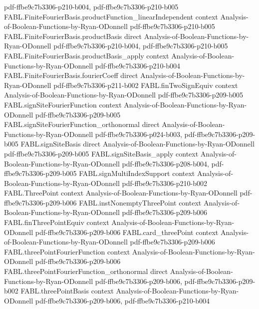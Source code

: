 \begin{theorem}
  {pdf-ffbe9c7b3306-p210-b004,
    pdf-ffbe9c7b3306-p210-b005}
\proofstep
  {FABL.FiniteFourierBasis.productFunction_linearIndependent}
  {context}
  {Analysis-of-Boolean-Functions-by-Ryan-ODonnell}
  {pdf-ffbe9c7b3306-p210-b005}
\proofstep
  {FABL.FiniteFourierBasis.productBasis}
  {direct}
  {Analysis-of-Boolean-Functions-by-Ryan-ODonnell}
  {pdf-ffbe9c7b3306-p210-b004,
    pdf-ffbe9c7b3306-p210-b005}
\proofstep
  {FABL.FiniteFourierBasis.productBasis_apply}
  {context}
  {Analysis-of-Boolean-Functions-by-Ryan-ODonnell}
  {pdf-ffbe9c7b3306-p210-b004}
\proofstep
  {FABL.FiniteFourierBasis.fourierCoeff}
  {direct}
  {Analysis-of-Boolean-Functions-by-Ryan-ODonnell}
  {pdf-ffbe9c7b3306-p211-b002}
\proofstep
  {FABL.finTwoSignEquiv}
  {context}
  {Analysis-of-Boolean-Functions-by-Ryan-ODonnell}
  {pdf-ffbe9c7b3306-p209-b005}
\proofstep
  {FABL.signSiteFourierFunction}
  {context}
  {Analysis-of-Boolean-Functions-by-Ryan-ODonnell}
  {pdf-ffbe9c7b3306-p209-b005}
\proofstep
  {FABL.signSiteFourierFunction_orthonormal}
  {direct}
  {Analysis-of-Boolean-Functions-by-Ryan-ODonnell}
  {pdf-ffbe9c7b3306-p024-b003,
    pdf-ffbe9c7b3306-p209-b005}
\proofstep
  {FABL.signSiteBasis}
  {direct}
  {Analysis-of-Boolean-Functions-by-Ryan-ODonnell}
  {pdf-ffbe9c7b3306-p209-b005}
\proofstep
  {FABL.signSiteBasis_apply}
  {context}
  {Analysis-of-Boolean-Functions-by-Ryan-ODonnell}
  {pdf-ffbe9c7b3306-p208-b004,
    pdf-ffbe9c7b3306-p209-b005}
\proofstep
  {FABL.signMultiIndexSupport}
  {context}
  {Analysis-of-Boolean-Functions-by-Ryan-ODonnell}
  {pdf-ffbe9c7b3306-p210-b002}
\proofstep
  {FABL.ThreePoint}
  {context}
  {Analysis-of-Boolean-Functions-by-Ryan-ODonnell}
  {pdf-ffbe9c7b3306-p209-b006}
\proofstep
  {FABL.instNonemptyThreePoint}
  {context}
  {Analysis-of-Boolean-Functions-by-Ryan-ODonnell}
  {pdf-ffbe9c7b3306-p209-b006}
\proofstep
  {FABL.finThreePointEquiv}
  {context}
  {Analysis-of-Boolean-Functions-by-Ryan-ODonnell}
  {pdf-ffbe9c7b3306-p209-b006}
\proofstep
  {FABL.card_threePoint}
  {context}
  {Analysis-of-Boolean-Functions-by-Ryan-ODonnell}
  {pdf-ffbe9c7b3306-p209-b006}
\proofstep
  {FABL.threePointFourierFunction}
  {context}
  {Analysis-of-Boolean-Functions-by-Ryan-ODonnell}
  {pdf-ffbe9c7b3306-p209-b006}
\proofstep
  {FABL.threePointFourierFunction_orthonormal}
  {direct}
  {Analysis-of-Boolean-Functions-by-Ryan-ODonnell}
  {pdf-ffbe9c7b3306-p209-b006,
    pdf-ffbe9c7b3306-p209-b002}
\proofstep
  {FABL.threePointBasis}
  {context}
  {Analysis-of-Boolean-Functions-by-Ryan-ODonnell}
  {pdf-ffbe9c7b3306-p209-b006,
    pdf-ffbe9c7b3306-p210-b004}
\proofstep

\end{theorem}
